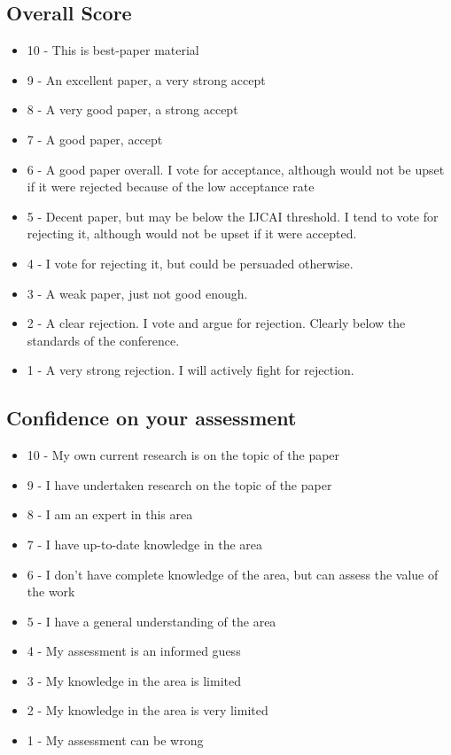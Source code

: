 \documentclass[a4paper]{article}
\begin{document}
\subsection{Overall Score}

\begin{itemize}
	\item 10 - This is best-paper material
	\item 9 - An excellent paper, a very strong accept
	\item 8 - A very good paper, a strong accept
	\item 7 - A good paper, accept
	\item 6 - A good paper overall. I vote for acceptance, although would not be upset if it were rejected because of the low acceptance rate
	\item 5 - Decent paper, but may be below the IJCAI threshold. I tend to vote for rejecting it, although would not be upset if it were accepted.
	\item 4 - I vote for rejecting it, but could be persuaded otherwise.
	\item 3 - A weak paper, just not good enough.
	\item 2 - A clear rejection. I vote and argue for rejection. Clearly below the standards of the conference.
	\item 1 - A very strong rejection. I will actively fight for rejection.
\end{itemize}

\subsection{Confidence on your assessment}

\begin{itemize}
	\item 10 - My own current research is on the topic of the paper
	\item 9 - I have undertaken research on the topic of the paper
	\item 8 - I am an expert in this area
	\item 7 - I have up-to-date knowledge in the area
	\item 6 - I don't have complete knowledge of the area, but can assess the value of the work
	\item 5 - I have a general understanding of the area
	\item 4 - My assessment is an informed guess
	\item 3 - My knowledge in the area is limited
	\item 2 - My knowledge in the area is very limited
	\item 1 - My assessment can be wrong
\end{itemize}
\end{document}
